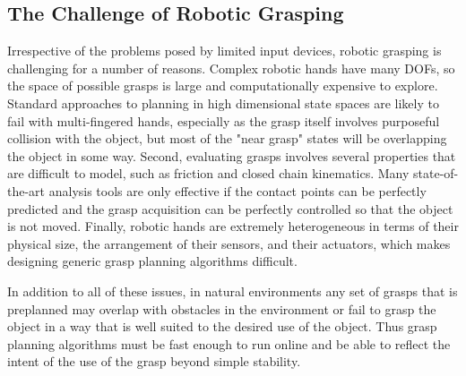 \subsection{The Challenge of Robotic Grasping}
Irrespective of the problems posed by limited input devices, robotic grasping is challenging for a number of reasons. Complex robotic hands have many DOFs, so the space of possible grasps is large and computationally expensive to explore. Standard approaches to planning in high dimensional state spaces are likely to fail with multi-fingered hands, especially as the grasp itself involves purposeful collision with the object, but most of the "near grasp" states will be overlapping the object in some way. Second, evaluating grasps involves several properties that are difficult to model, such as friction and closed chain kinematics. Many state-of-the-art analysis tools are only effective if the contact points can be perfectly predicted and the grasp acquisition can be perfectly controlled so that the object is not moved. Finally, robotic hands are extremely heterogeneous in terms of their physical size, the arrangement of their sensors, and their actuators, which makes designing generic grasp planning algorithms difficult.

In addition to all of these issues, in natural environments any set of grasps that is preplanned may overlap with obstacles in the environment or fail to grasp the object in a way that is well suited to the desired use of the object. Thus grasp planning algorithms must be fast enough to run online and be able to reflect the intent of the use of the grasp beyond simple stability.

